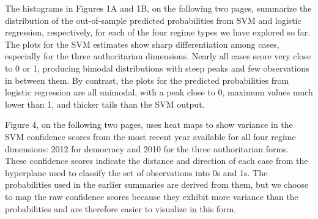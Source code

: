 \documentclass[pdftex,12pt,fullpage,oneside]{amsart}
\begin{document}
The histograms in Figures 1A and 1B, on the following two pages, summarize the distribution of the out-of-sample predicted probabilities from SVM and logistic regression, respectively, for each of the four regime types we have explored so far.  The plots for the SVM estimates show sharp differentiation among cases, especially for the three authoritarian dimensions. Nearly all cases score very close to 0 or 1, producing bimodal distributions with steep peaks and few observations in between them. By contrast, the plots for the predicted probabilities from logistic regression are all unimodal, with a peak close to 0, maximum values much lower than 1, and thicker tails than the SVM output. 


Figure 4, on the following two pages, uses heat maps to show variance in the SVM confidence scores from the most recent year available for all four regime dimensions: 2012 for democracy and 2010 for the three authoritarian forms. These confidence scores indicate the distance and direction of each case from the hyperplane used to classify the set of observations into 0s and 1s. The probabilities used in the earlier summaries are derived from them, but we choose to map the raw confidence scores because they exhibit more variance than the probabilities and are therefore easier to visualize in this form.
\end{document}
